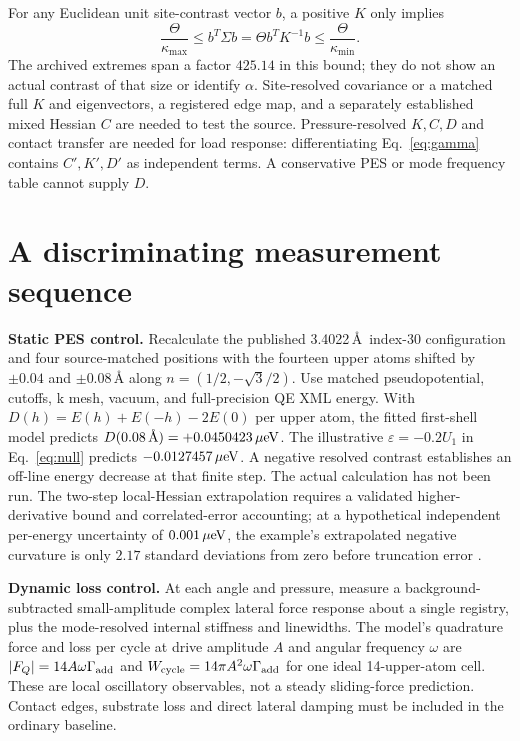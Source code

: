 \documentclass[9pt,a4paper,twocolumn]{extarticle}
\begin{document}
For any Euclidean unit site-contrast vector $b$, a positive $K$ only implies
\begin{equation}
 \frac{\Theta}{\kappa_{\max}}\leq
 b^T\Sigma b=\Theta b^TK^{-1}b
 \leq\frac{\Theta}{\kappa_{\min}}.\label{eq:bound}
\end{equation}
The archived extremes span a factor $425.14$ in this bound; they do not show an actual contrast of that size or identify $\alpha$. Site-resolved covariance or a matched full $K$ and eigenvectors, a registered edge map, and a separately established mixed Hessian $C$ are needed to test the source. Pressure-resolved $K,C,D$ and contact transfer are needed for load response: differentiating Eq.~\eqref{eq:gamma} contains $C',K',D'$ as independent terms. A conservative PES or mode frequency table cannot supply $D$.

\section{A discriminating measurement sequence}
\textbf{Static PES control.} Recalculate the published 3.4022\,\AA\ index-30 configuration and four source-matched positions with the fourteen upper atoms shifted by $\pm0.04$ and $\pm0.08\,\text{\AA}$ along $n=(1/2,-\sqrt3/2)$. Use matched pseudopotential, cutoffs, k mesh, vacuum, and full-precision QE XML energy. With $D(h)=E(h)+E(-h)-2E(0)$ per upper atom, the fitted first-shell model predicts $D(0.08\,\text{\AA})=+0.0450423\,\mu{\rm eV}$. The illustrative $\varepsilon=-0.2U_1$ in Eq.~\eqref{eq:null} predicts $-0.0127457\,\mu{\rm eV}$. A negative resolved contrast establishes an off-line energy decrease at that finite step. The actual calculation has not been run. The two-step local-Hessian extrapolation requires a validated higher-derivative bound and correlated-error accounting; at a hypothetical independent per-energy uncertainty of $0.001\,\mu{\rm eV}$, the example's extrapolated negative curvature is only $2.17$ standard deviations from zero before truncation error \cite{udrecord}.

\textbf{Dynamic loss control.} At each angle and pressure, measure a background-subtracted small-amplitude complex lateral force response about a single registry, plus the mode-resolved internal stiffness and linewidths. The model's quadrature force and loss per cycle at drive amplitude $A$ and angular frequency $\omega$ are $|F_Q|=14A\omega\Gamma_{\rm add}$ and $W_{\rm cycle}=14\pi A^2\omega\Gamma_{\rm add}$ for one ideal 14-upper-atom cell. These are local oscillatory observables, not a steady sliding-force prediction. Contact edges, substrate loss and direct lateral damping must be included in the ordinary baseline.
\end{document}

